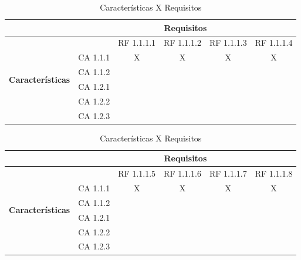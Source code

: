 \begin{table}[!h]
\centering
\caption{Características X Requisitos}
\label{Características_X_Requisitos_1}
\begin{tabular}{|c|c|c|c|c|c|}
\hline
  & \multicolumn{5}{c|}{\textbf{Requisitos}}                    \\ \hline
    \multirow{6}{*}{\textbf{Características}} &   & RF 1.1.1.1 & RF 1.1.1.2 & RF 1.1.1.3 & RF 1.1.1.4 \\ \cline{2-6}
                                       & CA 1.1.1 & X          & X          & X          & X         \\ \cline{2-6}
                                       & CA 1.1.2 &            &            &            &           \\ \cline{2-6}
                                       & CA 1.2.1 &            &            &            &           \\ \cline{2-6}
                                       & CA 1.2.2 &            &            &            &           \\ \cline{2-6}
                                       & CA 1.2.3 &            &            &            &           \\ \hline
\end{tabular}
\end{table}


\begin{table}[!h]
\centering
\caption{Características X Requisitos}
\label{Características_X_Requisitos_2}
\begin{tabular}{|c|c|c|c|c|c|}
\hline
  & \multicolumn{5}{c|}{\textbf{Requisitos}}                    \\ \hline
    \multirow{6}{*}{\textbf{Características}} &   & RF 1.1.1.5 & RF 1.1.1.6 & RF 1.1.1.7 & RF 1.1.1.8 \\ \cline{2-6}
                                       & CA 1.1.1 & X          & X          & X          & X         \\ \cline{2-6}
                                       & CA 1.1.2 &            &            &            &           \\ \cline{2-6}
                                       & CA 1.2.1 &            &            &            &           \\ \cline{2-6}
                                       & CA 1.2.2 &            &            &            &           \\ \cline{2-6}
                                       & CA 1.2.3 &            &            &            &           \\ \hline
\end{tabular}
\end{table}


